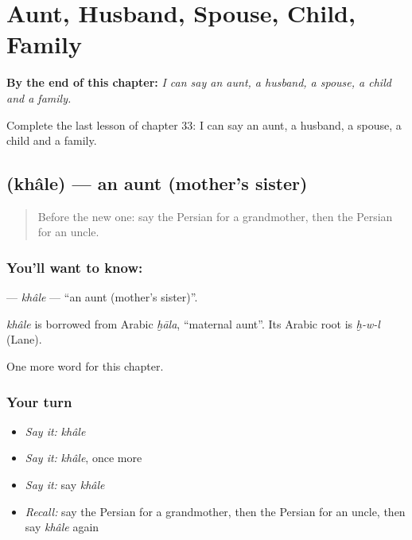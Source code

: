 
\chapter{Aunt, Husband, Spouse, Child, Family}
\label{ch:fa-aunt-husband-spouse-child-family}

\begin{chapteropening}
\textbf{By the end of this chapter:} \emph{I can say an aunt, a husband, a spouse, a child and a family.}

Complete the last lesson of chapter 33: I can say an aunt, a husband, a spouse, a child and a family.
\end{chapteropening}

\section[\texorpdfstring{\fa{خاله} (khâle)}{خاله (khâle)}]{ (khâle) — an aunt (mother's sister)}

\label{lesson:FA-C33-khale}



\begin{quote}
Before the new one: say the Persian for a grandmother, then the Persian for an uncle.
\end{quote}

\subsection*{You'll want to know: }
\textbf{} — \emph{khâle} — \textquotedblleft{}an aunt (mother's sister)\textquotedblright{}.

\begin{cousinweb}
\emph{khâle} is borrowed from Arabic \emph{ḫāla}, \textquotedblleft{}maternal aunt\textquotedblright{}. Its Arabic root is \emph{ḫ-w-l} (Lane).
\end{cousinweb}

\begin{grammarlens}[title={What you've built}]
One more word for this chapter.
\end{grammarlens}

\subsection*{Your turn}
\begin{itemize}
\raggedright
  \item \emph{Say it:} \emph{khâle}
  \item \emph{Say it:} \emph{khâle}, once more
  \item \emph{Say it:} say \emph{khâle}
  \item \emph{Recall:} say the Persian for a grandmother, then the Persian for an uncle, then say \emph{khâle} again
\end{itemize}

